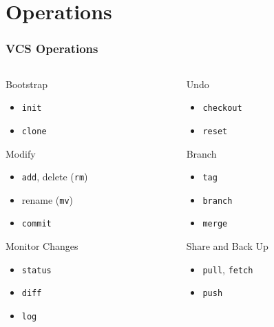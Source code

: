 \documentclass[english,compress]{beamer}
\newcommand{\cw}{\texttt} %
\begin{document}
\section{Operations}
\frame
{
    \frametitle{VCS Operations}
        \begin{columns}
            \begin{column}{.5\textwidth}
        Bootstrap
            \begin{itemize}
                \item \cw{init}
                \item \cw{clone}
            \end{itemize}
        Modify
        \begin{itemize}
            \item \cw{add}, delete (\cw{rm})
			\item rename (\cw{mv})
            \item \cw{commit}
        \end{itemize}
         Monitor Changes
        \begin{itemize}
            \item \cw{status}
            \item \cw{diff}
            \item \cw{log}
        \end{itemize}
   \end{column}
    \begin{column}{.5\textwidth}
        Undo
        \begin{itemize}
            \item \cw{checkout}
            \item \cw{reset}
        \end{itemize}
        Branch
        \begin{itemize}
            \item \cw{tag}
            \item \cw{branch}
            \item \cw{merge}
        \end{itemize}
        Share and Back Up
\begin{itemize}
    \item \cw{pull}, \cw{fetch}
    \item \cw{push}
\end{itemize}

    \end{column}
\end{columns}

}
\end{document}
